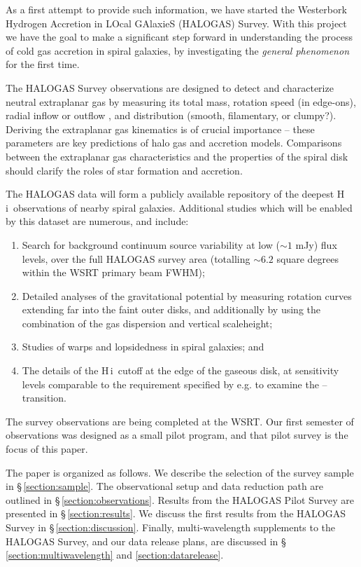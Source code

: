 \documentclass[oldversion]{aa}
\newcommand{\HI}{{\sc H\,i}}
\begin{document}
As a first attempt to provide such information, we have started the Westerbork Hydrogen Accretion in LOcal GAlaxieS (HALOGAS) Survey. With this project we have the goal to make a significant step forward in understanding the process of cold gas accretion in spiral galaxies, by investigating the {\it general phenomenon} for the first time.

The HALOGAS Survey observations are designed to detect and characterize neutral extraplanar gas by measuring its total mass, rotation speed (in edge-ons), radial inflow or outflow \citep[in inclined galaxies such as NGC~2403; see the work by][]{fraternali_etal_2002}, and distribution (smooth, filamentary, or clumpy?). Deriving the extraplanar gas kinematics is of crucial importance -- these parameters are key predictions of halo gas and accretion models. Comparisons between the extraplanar gas characteristics and the properties of the spiral disk should clarify the roles of star formation and accretion.

The HALOGAS data will form a publicly available repository of the deepest \HI\ observations of nearby spiral galaxies. Additional studies which will be enabled by this dataset are numerous, and include:
\begin{enumerate}
\item Search for background continuum source variability at low ($\sim1$ mJy) flux levels, over the full HALOGAS survey area (totalling $\sim6.2$ square degrees within the WSRT primary beam FWHM);
\item Detailed analyses of the gravitational potential by measuring rotation curves extending far into the faint outer disks, and additionally by using the combination of the gas dispersion and vertical scaleheight;
\item Studies of warps and lopsidedness in spiral galaxies; and
\item The details of the \HI\ cutoff at the edge of the gaseous disk, at sensitivity levels comparable to the requirement specified by e.g. \citet{corbelli_bandiera_2002} to examine the  --  transition.
\end{enumerate}

The survey observations are being completed at the WSRT. Our first semester of observations was designed as a small pilot program, and that pilot survey is the focus of this paper.

The paper is organized as follows. We describe the selection of the survey sample in \S\,\ref{section:sample}. The observational setup and data reduction path are outlined in \S\,\ref{section:observations}. Results from the HALOGAS Pilot Survey are presented in \S\,\ref{section:results}. We discuss the first results from the HALOGAS Survey in \S\,\ref{section:discussion}. Finally, multi-wavelength supplements to the HALOGAS Survey, and our data release plans, are discussed in \S\,\ref{section:multiwavelength} and \ref{section:datarelease}.
\end{document}
